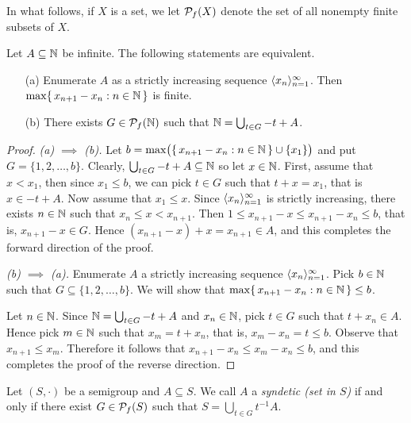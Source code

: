 In what follows, if $X$ is a set, we let $\mathcal{P}_f(X)$ denote the set of all nonempty finite subsets of $X$. 

\begin{prop}
  \label{prop:syn}
  Let $A \subseteq \mathbb{N}$ be infinite.
  The following statements are equivalent.
  \begin{itemize}
    \item[(a)] Enumerate $A$ as a strictly increasing sequence $\langle x_n \rangle_{n=1}^\infty$.
      Then $\max\{\, x_{n+1} - x_n : n \in \mathbb{N} \,\}$ is finite.

    \item[(b)] There exists $G \in \mathcal{P}_f(\mathbb{N})$ such that $\mathbb{N} = \bigcup_{t \in G} -t + A$. 
  \end{itemize}
\end{prop}
\begin{proof}
  \textsl{(a) $\implies$ (b).}
  Let $b = \max\bigl(\{\, x_{n+1} - x_n : n \in \mathbb{N} \,\} \cup \{x_1\}\bigr)$ and put $G = \{1, 2, \ldots, b\}$. 
  Clearly, $\bigcup_{t \in G} -t + A \subseteq \mathbb{N}$ so let $x \in \mathbb{N}$. 
  First, assume that $x < x_1$, then since $x_1 \le b$, we can pick $t \in G$ such that $t + x = x_1$, that is $x \in -t + A$.
  Now assume that $x_1 \le x$.
  Since $\langle x_n \rangle_{n=1}^\infty$ is strictly increasing, there exists $n \in \mathbb{N}$ such that $x_n \le x < x_{n+1}$.  
  Then $1 \le x_{n+1} - x \le x_{n+1} - x_n \le b$, that is, $x_{n+1} - x \in G$.
  Hence $(x_{n+1} - x) + x = x_{n+1} \in A$, and this completes the forward direction of the proof.

  \textsl{(b) $\implies$ (a).}
  Enumerate $A$ a strictly increasing sequence $\langle x_n \rangle_{n=1}^\infty$. 
  Pick $b \in \mathbb{N}$ such that $G \subseteq \{1, 2, \ldots, b\}$.
  We will show that $\max\{\, x_{n+1} - x_n : n \in \mathbb{N} \,\} \le b$. 

  Let $n \in \mathbb{N}$.
  Since $\mathbb{N} = \bigcup_{t \in G} -t+A$ and $x_n \in \mathbb{N}$, pick $t \in G$ such that $t + x_n \in A$.
  Hence pick $m \in \mathbb{N}$ such that $x_m = t + x_n$, that is, $x_m - x_n = t \le b$. 
  Observe that $x_{n+1} \le x_m$.
  Therefore it follows that $x_{n+1} - x_n \le x_m - x_n \le b$, and this completes the proof of the reverse direction.
\end{proof}

\begin{defn}
  Let $(S, \cdot)$ be a semigroup and $A \subseteq S$.
  We call $A$ a \emph{syndetic (set in $S$)} if and only if there exist $G \in \mathcal{P}_f(S)$ such that $S = \bigcup_{t \in G} t^{-1}A$. 
\end{defn}

